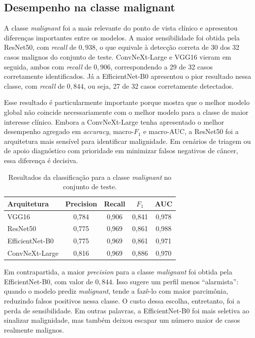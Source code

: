 \documentclass[tcc,capa]{texufpel}
\begin{document}
\subsection{Desempenho na classe malignant}

A classe \textit{malignant} foi a mais relevante do ponto de vista clínico e apresentou diferenças importantes entre os modelos. A maior sensibilidade foi obtida pela ResNet50, com \textit{recall} de \(0{,}938\), o que equivale à detecção correta de 30 dos 32 casos malignos do conjunto de teste. ConvNeXt-Large e VGG16 vieram em seguida, ambos com \textit{recall} de \(0{,}906\), correspondendo a 29 de 32 casos corretamente identificados. Já a EfficientNet-B0 apresentou o pior resultado nessa classe, com \textit{recall} de \(0{,}844\), ou seja, 27 de 32 casos corretamente detectados.

Esse resultado é particularmente importante porque mostra que o melhor modelo global não coincide necessariamente com o melhor modelo para a classe de maior interesse clínico. Embora a ConvNeXt-Large tenha apresentado o melhor desempenho agregado em \textit{accuracy}, macro-\(F_1\) e macro-AUC, a ResNet50 foi a arquitetura mais sensível para identificar malignidade. Em cenários de triagem ou de apoio diagnóstico com prioridade em minimizar falsos negativos de câncer, essa diferença é decisiva.

\begin{table}[h]
	\centering
	\caption{Resultados da classificação para a classe \textit{malignant} no conjunto de teste.}
	\label{tab:resultados_malignant}
	\begin{tabular}{lcccc}
		\hline
		\textbf{Arquitetura} & \textbf{Precision} & \textbf{Recall} & \textbf{$F_1$} & \textbf{AUC} \\
		\hline
		VGG16            & 0{,}784 & 0{,}906 & 0{,}841 & 0{,}978 \\
		ResNet50         & 0{,}775 & 0{,}969 & 0{,}861 & 0{,}988 \\
		EfficientNet-B0  & 0{,}775 & 0{,}969 & 0{,}861 & 0{,}971 \\
		ConvNeXt-Large   & 0{,}816 & 0{,}969 & 0{,}886 & 0{,}970 \\
		\hline
	\end{tabular}
\end{table}

Em contrapartida, a maior \textit{precision} para a classe \textit{malignant} foi obtida pela EfficientNet-B0, com valor de \(0{,}844\). Isso sugere um perfil menos “alarmista”: quando o modelo prediz \textit{malignant}, tende a fazê-lo com maior parcimônia, reduzindo falsos positivos nessa classe. O custo dessa escolha, entretanto, foi a perda de sensibilidade. Em outras palavras, a EfficientNet-B0 foi mais seletiva ao sinalizar malignidade, mas também deixou escapar um número maior de casos realmente malignos.
\end{document}
